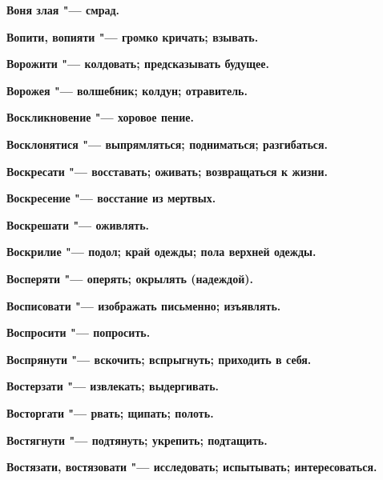 \begin{mymulticols}{2}
\bfseries Воня злая\normalfont{} "--- смрад. 




\bfseries Вопити, вопияти\normalfont{} "--- громко кричать; взывать. 




\bfseries Ворожити\normalfont{} "--- колдовать; предсказывать будущее. 




\bfseries Ворожея\normalfont{} "--- волшебник; колдун; отравитель. 




\bfseries Воскликновение\normalfont{} "--- хоровое пение. 




\bfseries Восклонятися\normalfont{} "--- выпрямляться; подниматься; разгибаться. 




\bfseries Воскресати\normalfont{} "--- восставать; оживать; возвращаться к жизни. 




\bfseries Воскресение\normalfont{} "--- восстание из мертвых. 




\bfseries Воскрешати\normalfont{} "--- оживлять. 




\bfseries Воскрилие\normalfont{} "--- подол; край одежды; пола верхней одежды. 




\bfseries Восперяти\normalfont{} "--- оперять; окрылять (надеждой). 




\bfseries Восписовати\normalfont{} "--- изображать письменно; изъявлять. 




\bfseries Воспросити\normalfont{} "--- попросить. 




\bfseries Воспрянути\normalfont{} "--- вскочить; вспрыгнуть; приходить в себя. 




\bfseries Востерзати\normalfont{} "--- извлекать; выдергивать. 




\bfseries Восторгати\normalfont{} "--- рвать; щипать; полоть. 




\bfseries Востягнути\normalfont{} "--- подтянуть; укрепить; подтащить. 




\bfseries Востязати, востязовати\normalfont{} "--- исследовать; испытывать; интересоваться. 





\end{mymulticols}
